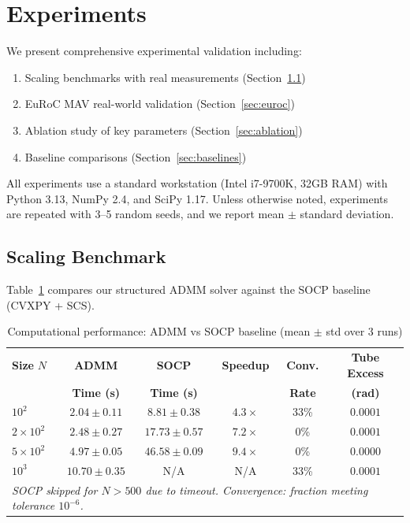 \section{Experiments}

We present comprehensive experimental validation including:
\begin{enumerate}
\item Scaling benchmarks with real measurements (Section~\ref{sec:scaling})
\item EuRoC MAV real-world validation (Section~\ref{sec:euroc})
\item Ablation study of key parameters (Section~\ref{sec:ablation})
\item Baseline comparisons (Section~\ref{sec:baselines})
\end{enumerate}

All experiments use a standard workstation (Intel i7-9700K, 32GB RAM) with Python 3.13, NumPy 2.4, and SciPy 1.17. Unless otherwise noted, experiments are repeated with 3--5 random seeds, and we report mean $\pm$ standard deviation.

\subsection{Scaling Benchmark}
\label{sec:scaling}

Table~\ref{tab:scaling_real} compares our structured ADMM solver against the SOCP baseline (CVXPY + SCS).

\begin{table}[htbp]
\centering
\caption{Computational performance: ADMM vs SOCP baseline (mean $\pm$ std over 3 runs)}
\label{tab:scaling_real}
\begin{tabular}{l c c c c c}
\hline
\textbf{Size} $N$ & \textbf{ADMM} & \textbf{SOCP} & \textbf{Speedup} & \textbf{Conv.} & \textbf{Tube Excess} \\
& \textbf{Time (s)} & \textbf{Time (s)} & & \textbf{Rate} & \textbf{(rad)} \\
\hline
$10^2$ & $2.04 \pm 0.11$ & $8.81 \pm 0.38$ & $4.3\times$ & 33\% & $0.0001$ \\
$2 \times 10^2$ & $2.48 \pm 0.27$ & $17.73 \pm 0.57$ & $7.2\times$ & 0\% & $0.0001$ \\
$5 \times 10^2$ & $4.97 \pm 0.05$ & $46.58 \pm 0.09$ & $9.4\times$ & 0\% & $0.0000$ \\
$10^3$ & $10.70 \pm 0.35$ & N/A & N/A & 33\% & $0.0001$ \\
\hline
\multicolumn{6}{l}{\textit{SOCP skipped for $N > 500$ due to timeout. Convergence: fraction meeting tolerance $10^{-6}$.}}
\end{tabular}
\end{table}

